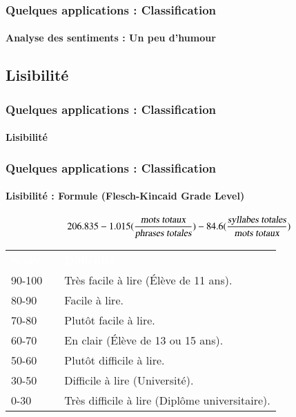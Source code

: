 \documentclass[xcolor=table]{beamer}
\begin{document}
\begin{frame}
	\frametitle{Quelques applications : Classification}
	\framesubtitle{Analyse des sentiments : Un peu d'humour}
	
	\begin{center}
	\end{center}
	
\end{frame}

\subsection{Lisibilité}

\begin{frame}
	\frametitle{Quelques applications : Classification}
	\framesubtitle{Lisibilité}
\end{frame}

\begin{frame}
	\frametitle{Quelques applications : Classification}
	\framesubtitle{Lisibilité : Formule (Flesch-Kincaid Grade Level)}
	\[
	206.835 - 1.015 (\frac{\text{\slshape mots totaux}}{\text{\slshape phrases totales}})
	- 84.6 (\frac{\text{\slshape syllabes totales}}{\text{\slshape mots totaux}})
	\]
	
	\begin{center}
			\footnotesize
		\begin{tabular}{p{}lp{}}
			\rowcolor{darkblue}
			\bfseries\textcolor{white}{Score} && \bfseries\textcolor{white}{Difficulté}\\
			90-100 && Très facile à lire (Élève de 11 ans). \\
			80-90 && Facile à lire. \\
			70-80 && Plutôt facile à lire.\\
			60-70 && En clair (Élève de 13 ou 15 ans). \\
			50-60 && Plutôt difficile à lire. \\
			30-50 && Difficile à lire (Université). \\
			0-30 && Très difficile à lire (Diplôme universitaire). \\
		\end{tabular}
	\end{center}
	
\end{frame}
\end{document}
